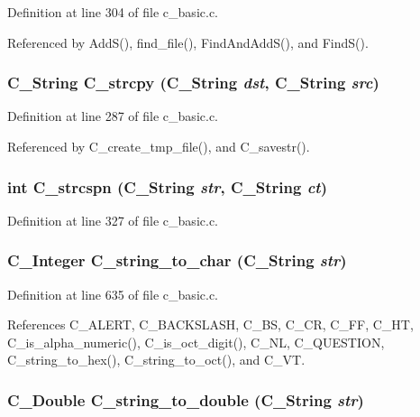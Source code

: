 Definition at line 304 of file c\_\-basic.c.

Referenced by Add\-S(), find\_\-file(), Find\-And\-Add\-S(), and Find\-S().
\subsubsection{\setlength{\rightskip}{0pt plus 5cm}\bf{C\_\-String} C\_\-strcpy (\bf{C\_\-String} {\em dst}, \bf{C\_\-String} {\em src})}\label{c__basic_8c_41b0f03bbee22df2e06acab0cefbea77}




Definition at line 287 of file c\_\-basic.c.

Referenced by C\_\-create\_\-tmp\_\-file(), and C\_\-savestr().
\subsubsection{\setlength{\rightskip}{0pt plus 5cm}int C\_\-strcspn (\bf{C\_\-String} {\em str}, \bf{C\_\-String} {\em ct})}\label{c__basic_8c_eb3d52b7de4c4578a68b262be7f4807f}




Definition at line 327 of file c\_\-basic.c.
\subsubsection{\setlength{\rightskip}{0pt plus 5cm}\bf{C\_\-Integer} C\_\-string\_\-to\_\-char (\bf{C\_\-String} {\em str})}\label{c__basic_8c_2649b1d83736c636f9b50ce62ae2bc9a}




Definition at line 635 of file c\_\-basic.c.

References C\_\-ALERT, C\_\-BACKSLASH, C\_\-BS, C\_\-CR, C\_\-FF, C\_\-HT, C\_\-is\_\-alpha\_\-numeric(), C\_\-is\_\-oct\_\-digit(), C\_\-NL, C\_\-QUESTION, C\_\-string\_\-to\_\-hex(), C\_\-string\_\-to\_\-oct(), and C\_\-VT.
\subsubsection{\setlength{\rightskip}{0pt plus 5cm}\bf{C\_\-Double} C\_\-string\_\-to\_\-double (\bf{C\_\-String} {\em str})}\label{c__basic_8c_673922efde029f4f6fea0f7ce8e9395e}




